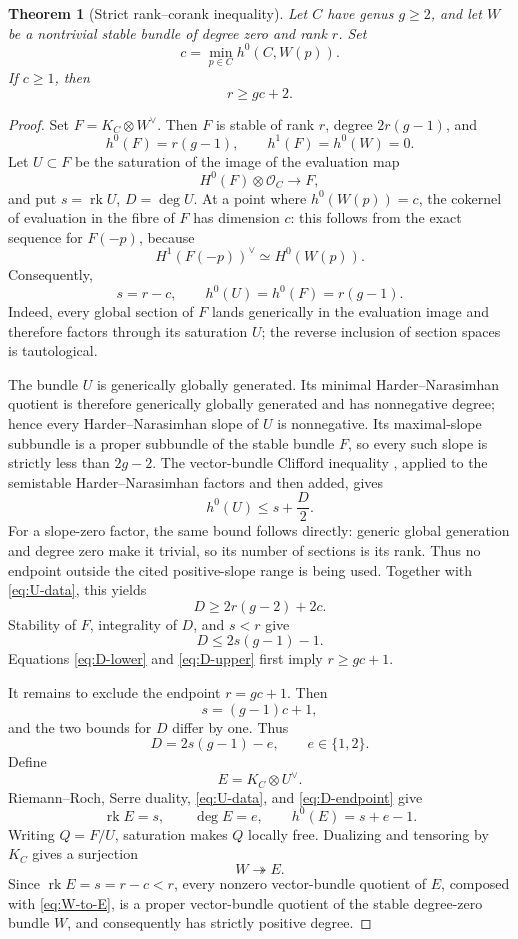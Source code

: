 \documentclass[11pt,reqno]{amsart}
\numberwithin{equation}{section}
\newtheorem{theorem}{Theorem}[section]
\theoremstyle{remark}
\DeclareMathOperator{\rk}{rk}
\newcommand{\cO}{\mathcal O}
\begin{document}
\begin{theorem}[Strict rank--corank inequality]\label{thm:strict-rank}
Let \(C\) have genus \(g\geq2\), and let \(W\) be a nontrivial stable
bundle of degree zero and rank \(r\).  Set
\[
 c=\min_{p\in C}h^0(C,W(p)).
\]
If \(c\geq1\), then
\[
 r\geq gc+2.
\tag{6.1}\label{eq:strict-rank}
\]
\end{theorem}

\begin{proof}
Set \(F=K_C\otimes W^\vee\).  Then \(F\) is stable of rank \(r\), degree
\(2r(g-1)\), and
\[
 h^0(F)=r(g-1),\qquad h^1(F)=h^0(W)=0.
\tag{6.2}\label{eq:F-sections}
\]
Let \(U\subset F\) be the saturation of the image of the evaluation map
\[
 H^0(F)\otimes\cO_C\longrightarrow F,
\]
and put \(s=\rk U\), \(D=\deg U\).  At a point where \(h^0(W(p))=c\),
the cokernel of evaluation in the fibre of \(F\) has dimension \(c\):
this follows from the exact sequence for \(F(-p)\), because
\[
 H^1(F(-p))^\vee\simeq H^0(W(p)).
\]
Consequently,
\[
 s=r-c,\qquad h^0(U)=h^0(F)=r(g-1).
\tag{6.3}\label{eq:U-data}
\]
Indeed, every global section of \(F\) lands generically in the
evaluation image and therefore factors through its saturation \(U\);
the reverse inclusion of section spaces is tautological.

The bundle \(U\) is generically globally generated.  Its minimal
Harder--Narasimhan quotient is therefore generically globally generated
and has nonnegative degree; hence every Harder--Narasimhan slope of
\(U\) is nonnegative.  Its maximal-slope subbundle is a proper subbundle
of the stable bundle \(F\), so every such slope is strictly less than
\(2g-2\).  The vector-bundle Clifford inequality
\cite[Theorem 2.1]{BrambilaPazGN}, applied to the semistable
Harder--Narasimhan factors and then added, gives
\[
 h^0(U)\leq s+\frac D2.
\]
For a slope-zero factor, the same bound follows directly: generic global
generation and degree zero make it trivial, so its number of sections is
its rank.  Thus no endpoint outside the cited positive-slope range is
being used.
Together with \eqref{eq:U-data}, this yields
\[
 D\geq2r(g-2)+2c.
\tag{6.4}\label{eq:D-lower}
\]
Stability of \(F\), integrality of \(D\), and \(s<r\) give
\[
 D\leq2s(g-1)-1.
\tag{6.5}\label{eq:D-upper}
\]
Equations \eqref{eq:D-lower} and \eqref{eq:D-upper} first imply
\(r\geq gc+1\).

It remains to exclude the endpoint \(r=gc+1\).  Then
\[
 s=(g-1)c+1,
\]
and the two bounds for \(D\) differ by one.  Thus
\[
 D=2s(g-1)-e,\qquad e\in\{1,2\}.
\tag{6.6}\label{eq:D-endpoint}
\]
Define
\[
 E=K_C\otimes U^\vee.
\]
Riemann--Roch, Serre duality, \eqref{eq:U-data}, and
\eqref{eq:D-endpoint} give
\[
 \rk E=s,\qquad \deg E=e,\qquad h^0(E)=s+e-1.
\tag{6.7}\label{eq:E-data}
\]
Writing \(Q=F/U\), saturation makes \(Q\) locally free.  Dualizing and
tensoring by \(K_C\) gives a surjection
\[
 W\twoheadrightarrow E.
\tag{6.8}\label{eq:W-to-E}
\]
Since \(\rk E=s=r-c<r\), every nonzero vector-bundle quotient of \(E\),
composed with \eqref{eq:W-to-E}, is a proper vector-bundle quotient of
the stable degree-zero bundle \(W\), and consequently has strictly
positive degree.


\end{proof}
\end{document}
